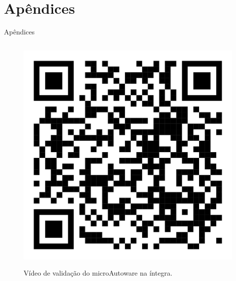 \documentclass{if-beamer}
\begin{document}
%   

\section{Apêndices}

\begin{frame}{Apêndices}
	
	\begin{columns}
		
		\begin{column}{0.5\textwidth}
			
			\begin{figure}[H]
				\centering
				\href{https://youtu.be/7OOIyOqvU_o}{\includegraphics[width=0.8\linewidth]{qr_code_youtube}}
				\caption{Vídeo de validação do microAutoware na íntegra.}
				\label{fig:qr_code_youtube}
			\end{figure}
		
		
			
		\end{column}
		

\end{columns}
\end{frame}
\end{document}
